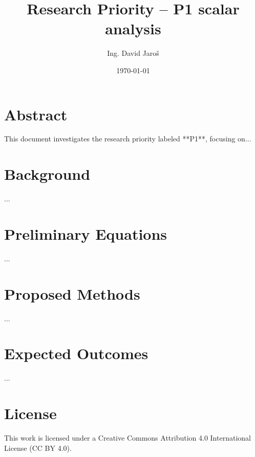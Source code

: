 \documentclass[12pt]{article}
\title{Research Priority – P1 scalar analysis}
\author{Ing. David Jaroš}
\date{\today}
\begin{document}
\maketitle

\section*{Abstract}
This document investigates the research priority labeled **P1**, focusing on...

\section*{Background}
...

\section*{Preliminary Equations}
...

\section*{Proposed Methods}
...

\section*{Expected Outcomes}
...


\section*{License}
This work is licensed under a Creative Commons Attribution 4.0 International License (CC BY 4.0).
\end{document}
